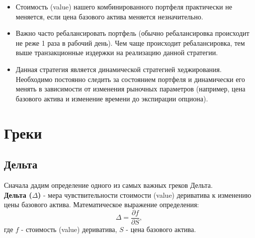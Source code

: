 \documentclass{article}
\begin{document}
\begin{itemize}
	\item Стоимость (value) нашего комбинированного портфеля практически не меняется, если цена базового актива меняется незначительно.
	
	
	\item Важно часто ребалансировать портфель (обычно ребалансировка происходит не реже 1 раза в рабочий день). Чем чаще происходит ребалансировка, тем выше транзакционные издержки на реализацию данной стратегии.
	
	\item Данная стратегия является динамической стратегией хеджирования. Необходимо постоянно следить за состоянием портфеля и динамически его менять в зависимости от изменения рыночных параметров (например, цена базового актива и изменение времени до экспирации опциона).
	
\end{itemize}

 \section{Греки}
  \subsection{Дельта}
 Сначала дадим определение одного из самых важных греков Дельта.\\
 \textbf{\hypertarget{pdf}{Дельта} ($\Delta$) } - мера чувствительности стоимости (value) дериватива к изменению цены базового актива. Математическое выражение определения: $$\Delta = \dfrac{\partial f}{\partial S},$$ где $f$ - стоимость (value) дериватива, $S$ - цена базового актива.
 
\end{document}
